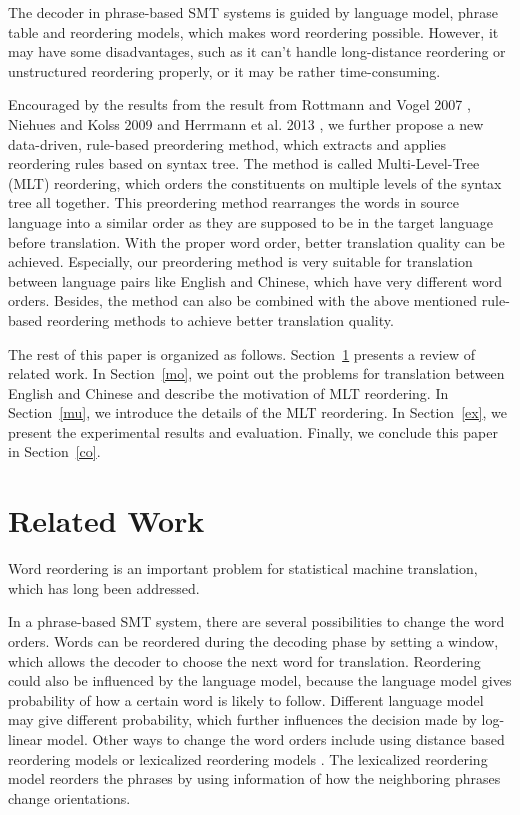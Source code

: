\documentclass[a4paper]{article}
\begin{document}
The decoder in phrase-based SMT systems is guided by language model, phrase table and reordering models, which makes word reordering possible. However, it may have some disadvantages, such as it can't handle long-distance reordering or unstructured reordering properly, or it may be rather time-consuming.

Encouraged by the results from the result from Rottmann and Vogel 2007 \cite{short}, Niehues and Kolss 2009 \cite{long} and Herr\-mann et al. 2013 \cite{tree}, we further propose a new data-driven, rule-based preordering method, which extracts and applies reordering rules based on syntax tree. The method is called Multi-Level-Tree (MLT) reordering, which orders the constituents on multiple levels of the syntax tree all together. This preordering method rearranges the words in source language into a similar order as they are supposed to be in the target language before translation. With the proper word order, better translation quality can be achieved. Especially, our preordering method is very suitable for translation between language pairs like English and Chinese, which have very different word orders. Besides, the method can also be combined with the above mentioned rule-based reordering methods to achieve better translation quality. 

The rest of this paper is organized as follows. Section~\ref{re} presents a review of related work. In Section~\ref{mo}, we point out the problems for translation between English and Chinese and describe the motivation of MLT reordering. In Section~\ref{mu}, we introduce the details of the MLT reordering. In Section~\ref{ex}, we present the experimental results and evaluation. Finally, we conclude this paper in Section~\ref{co}.

\section{Related Work}
\label{re}

Word reordering is an important problem for statistical machine translation, which has long been addressed.

In a phrase-based SMT system, there are several possibilities to change the word orders. Words can be reordered during the decoding phase by setting a window, which allows the decoder to choose the next word for translation. Reordering could also be influenced by the language model, because the language model gives probability of how a certain word is likely to follow. Different language model may give different probability, which further influences the decision made by log-linear model. Other ways to change the word orders include using distance based reordering models or lexicalized reordering models \cite{tillmann2004, koehn2005}. The lexicalized reordering model reorders the phrases by using information of how the neighboring phrases change orientations.
\end{document}
